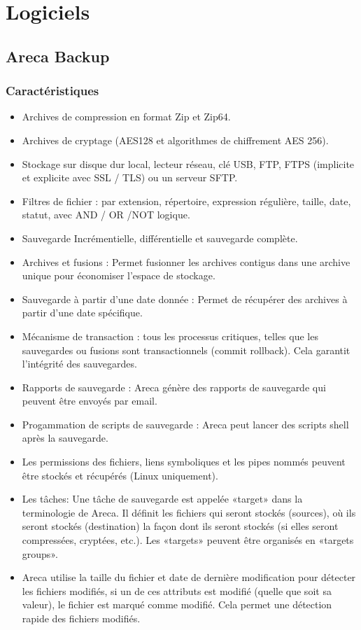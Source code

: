 \documentclass[a4paper,11pt]{report}
\begin{document}
\section{Logiciels}


\subsection{Areca Backup}
\subsubsection{Caractéristiques}
\begin{itemize}
  \item Archives de compression en format Zip et Zip64.
  \item Archives de cryptage (AES128 et algorithmes de chiffrement AES 256).
  \item Stockage sur disque dur local, lecteur réseau, clé USB, FTP, FTPS (implicite et explicite avec SSL / TLS) ou un serveur SFTP.
  \item Filtres de fichier : par extension, répertoire, expression régulière, taille, date, statut, avec AND / OR /NOT logique.
  \item Sauvegarde Incrémentielle, différentielle et sauvegarde complète.
  \item Archives et fusions : Permet fusionner les archives contigus dans une archive unique pour économiser l'espace de stockage.
  \item Sauvegarde à partir d'une date donnée : Permet de récupérer des archives à partir d'une date spécifique.
  \item Mécanisme de transaction : tous les processus critiques, telles que les sauvegardes ou fusions sont transactionnels (commit rollback). Cela garantit l'intégrité des sauvegardes.
  \item Rapports de sauvegarde : Areca génère des rapports de sauvegarde qui peuvent être envoyés par email.
  \item Progammation de scripts de sauvegarde : Areca peut lancer des scripts shell après la sauvegarde.
  \item Les permissions des fichiers, liens symboliques et les pipes nommés peuvent être stockés et récupérés (Linux uniquement).
  \item Les tâches: Une tâche de sauvegarde est appelée «target» dans la terminologie de Areca. Il définit les fichiers qui seront stockés (sources), où ils seront stockés (destination) la façon dont ils seront stockés (si elles seront compressées, cryptées, etc.).
Les «targets» peuvent être organisés en «targets groups».
  \item Areca utilise la taille du fichier et date de dernière modification pour détecter les fichiers modifiés, si un de ces attributs est modifié (quelle que soit sa valeur), le fichier est marqué comme modifié. Cela permet une détection rapide des fichiers modifiés.

\end{itemize}
\end{document}
